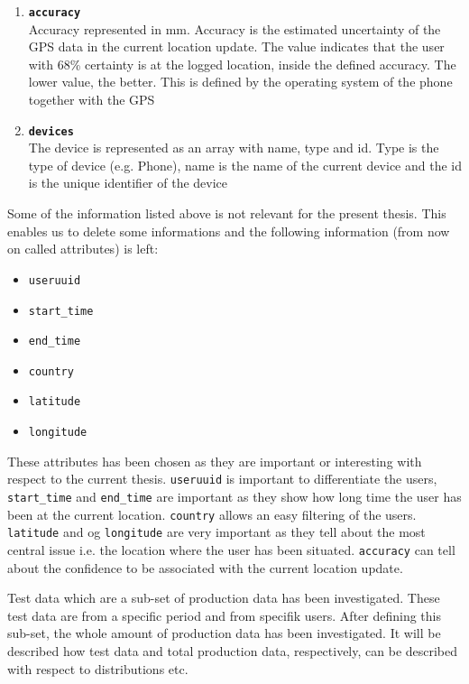 \begin{enumerate}
\item \texttt{\textbf{accuracy}}\\Accuracy represented in mm. Accuracy is the estimated uncertainty of the GPS data in the current location update. The value indicates that the user with 68\% certainty is at the logged location, inside the defined accuracy. The lower value, the better. This is defined by the operating system of the phone together with the GPS 
\item \texttt{\textbf{devices}}\\The device is represented as an array with name, type and id. Type is the type of device (e.g. Phone), name is the name of the current device and the id is the unique identifier of the device 
\end{enumerate}

Some of the information listed above is not relevant for the present thesis. This enables us to delete some informations and the following information (from now on called attributes) is left: 

\begin{itemize}
\item \texttt{useruuid}
\item \texttt{start\_time}
\item \texttt{end\_time}
\item \texttt{country}
\item \texttt{latitude}
\item \texttt{longitude}
\end{itemize}

These attributes has been chosen as they are important or interesting with respect to the current thesis. \texttt{useruuid} is important to differentiate the users, \texttt{start\_time} and \texttt{end\_time} are important as they show how long time the user has been at the current location. \texttt{country} allows an easy filtering of the users. \texttt{latitude} and og \texttt{longitude} are very important as they tell about the most central issue i.e. the location where the user has been situated. \texttt{accuracy} can tell about the confidence to be associated with the current location update.  

Test data which are a sub-set of production data has been investigated. These test data are from a specific period and from specifik users. After defining this sub-set, the whole amount of production data has been investigated.  It will be described how test data and total production data, respectively, can be described with respect to distributions etc.  


